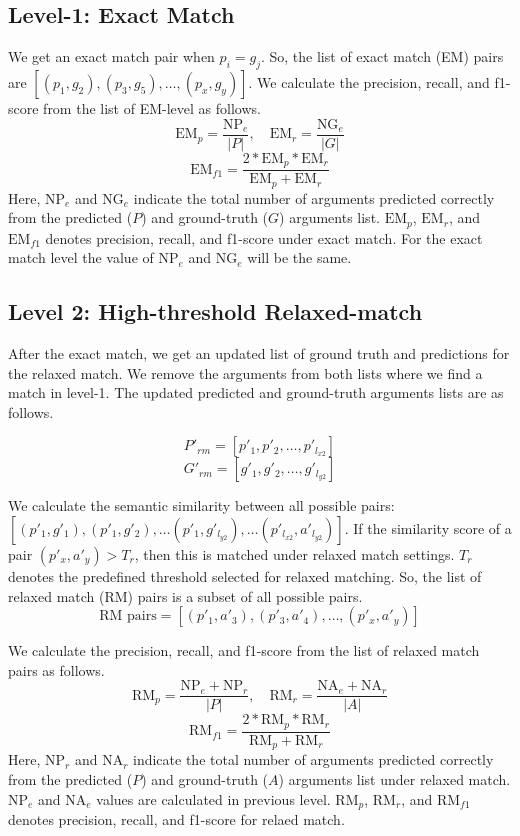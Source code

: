 \subsection{Level-1: Exact Match}
We get an exact match pair when \( p_i = g_j \). So, the list of exact match (EM) pairs are $[(p_1, g_2), (p_3, g_5), \ldots, (p_x, g_y)]$. We calculate the precision, recall, and f1-score from the list of EM-level as follows.
\[
\text{EM}_{p} = \frac{\text{NP}_e }{|P|}, \quad
\text{EM}_{r} = \frac{\text{NG}_e }{|G|}
\]
\[
\text{EM}_{f1} = \frac{2 * \text{EM}_{p} * \text{EM}_{r}}{\text{EM}_{p}+\text{EM}_{r}}
\]
Here, $\text{NP}_e$ and $\text{NG}_e$ indicate the total number of arguments predicted correctly from the predicted ($P$) and ground-truth ($G$) arguments list. $\text{EM}_{p}$, $\text{EM}_{r}$, and $\text{EM}_{f1}$ denotes precision, recall, and f1-score under exact match. For the exact match level the value of $\text{NP}_e$ and $\text{NG}_e$ will be the same.

\subsection{Level 2: High-threshold Relaxed-match}


After the exact match, we get an updated list of ground truth and predictions for the relaxed match. We remove the arguments from both lists where we find a match in level-1. The updated predicted and ground-truth arguments lists are as follows. 

\[
P'_{rm} = [p'_1, p'_2, \ldots, p'_{l_{x2}}]
\]
\[
G'_{rm} = [g'_1, g'_2, \ldots, g'_{l_{y2}}] 
\]

We calculate the semantic similarity between all possible pairs: $[(p'_1, g'_1), (p'_1, g'_2), \ldots (p'_1, g'_{l_{y2}}), \dots (p'_{l_{x2}}, a'_{l_{y2}})]$. If the similarity score of a pair $(p'_x, a'_y) > T_r$, then this is matched under relaxed match settings. $T_r$ denotes the predefined threshold selected for relaxed matching. So, the list of relaxed match (RM) pairs is a subset of all possible pairs.
\[
\text{RM pairs} = [(p'_1, a'_3), (p'_3, a'_4), \ldots, (p'_x, a'_y)]
\]

\noindent
We calculate the precision, recall, and f1-score from the list of relaxed match pairs as follows.
\[
\text{RM}_{p} = \frac{\text{NP}_e + \text{NP}_r}{|P|}, \quad
\text{RM}_{r} = \frac{\text{NA}_e + \text{NA}_r}{|A|}
\]
\[
\text{RM}_{f1} = \frac{2 * \text{RM}_{p} * \text{RM}_{r}}{\text{RM}_{p}+\text{RM}_{r}}
\]
Here, $\text{NP}_r$ and $\text{NA}_r$ indicate the total number of arguments predicted correctly from the predicted ($P$) and ground-truth ($A$) arguments list under relaxed match. $\text{NP}_e$ and $\text{NA}_e$ values are calculated in previous level. $\text{RM}_{p}$, $\text{RM}_{r}$, and $\text{RM}_{f1}$ denotes precision, recall, and f1-score for relaed match. 


